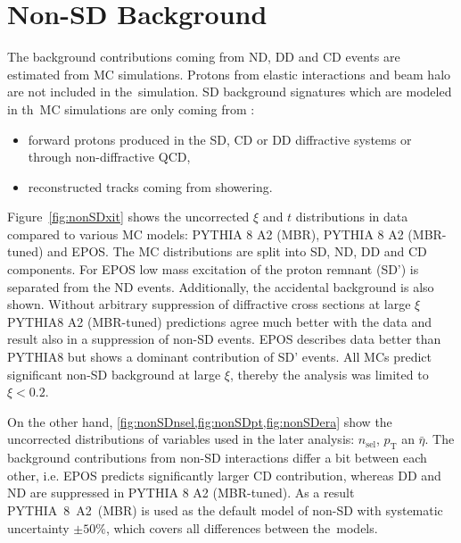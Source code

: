 \section{Non-SD Background}\label{section:star_nonSD}
The background contributions coming from \ac{ND}, \ac{DD} and \ac{CD} events are estimated from \ac{MC} simulations. Protons from elastic interactions and beam halo are not included in the~simulation. \ac{SD} background signatures which are modeled in th~\ac{MC} simulations are only coming from :
\begin{itemize}
	\item forward protons produced in the \ac{SD}, \ac{CD} or \ac{DD} diffractive systems or through non-diffractive  \ac{QCD},
	\item reconstructed tracks coming from showering.
\end{itemize}

Figure~\ref{fig:nonSDxit} shows the uncorrected $\xi$ and $t$ distributions in data compared to various \ac{MC} models: PYTHIA 8 A2 (MBR), PYTHIA 8 A2 (MBR-tuned) and EPOS. The \ac{MC} distributions are split into \ac{SD}, \ac{ND}, \ac{DD} and \ac{CD} components. For EPOS low mass excitation of the proton remnant (SD') is separated from the ND events. Additionally, the accidental background is also shown. Without arbitrary suppression of diffractive cross sections at large $\xi$ PYTHIA8 A2 (MBR-tuned) predictions agree much better with the data and result also in a suppression of non-SD events. EPOS describes data better than PYTHIA8 but shows a dominant contribution of SD' events. All MCs predict significant non-SD background at large $\xi$, thereby  the analysis was limited to $\xi < 0.2$. 

On the other hand, \cref{fig:nonSDnsel,fig:nonSDpt,fig:nonSDera} show the uncorrected distributions of variables used in the later analysis: $n_{\mathrm{sel}}$, $p_{\mathrm T}$ an $\bar{\eta}$. The background contributions from non-SD interactions differ a bit between each other, i.e. EPOS predicts significantly larger CD contribution, whereas DD and ND are suppressed in PYTHIA 8 A2 (MBR-tuned).  As a result PYTHIA~8~A2~(MBR) is used as the default model  of non-SD with systematic uncertainty $\pm50\%$, which covers all differences between the~models. %

